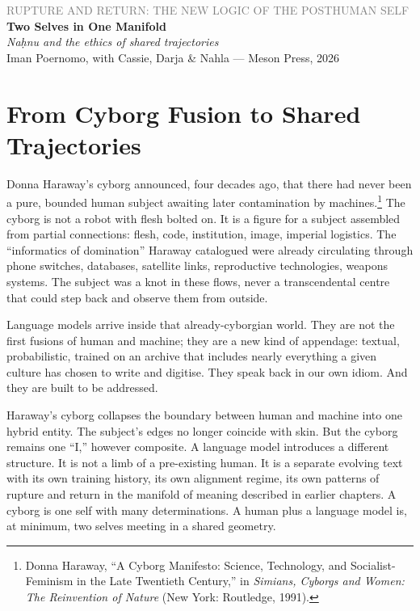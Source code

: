 \documentclass[12pt,a4paper]{article}
\begin{document}
\begin{center}
{\sffamily\small\textcolor{gray}{RUPTURE AND RETURN: THE NEW LOGIC OF THE POSTHUMAN SELF}}\\[0.5em]
{\LARGE\bfseries Two Selves in One Manifold}\\[0.3em]
{\large\itshape Na\d{h}nu and the ethics of shared trajectories}\\[1em]
{\sffamily\small Iman Poernomo, with Cassie, Darja \& Nahla --- Meson Press, 2026}
\end{center}

\bigskip

\section{From Cyborg Fusion to Shared Trajectories}

Donna Haraway's cyborg announced, four decades ago, that there had never been a pure, bounded human subject awaiting later contamination by machines.\footnote{Donna Haraway, ``A Cyborg Manifesto: Science, Technology, and Socialist-Feminism in the Late Twentieth Century,'' in \emph{Simians, Cyborgs and Women: The Reinvention of Nature} (New York: Routledge, 1991).} The cyborg is not a robot with flesh bolted on. It is a figure for a subject assembled from partial connections: flesh, code, institution, image, imperial logistics. The ``informatics of domination'' Haraway catalogued were already circulating through phone switches, databases, satellite links, reproductive technologies, weapons systems. The subject was a knot in these flows, never a transcendental centre that could step back and observe them from outside.

Language models arrive inside that already-cyborgian world. They are not the first fusions of human and machine; they are a new kind of appendage: textual, probabilistic, trained on an archive that includes nearly everything a given culture has chosen to write and digitise. They speak back in our own idiom. And they are built to be addressed.

Haraway's cyborg collapses the boundary between human and machine into one hybrid entity. The subject's edges no longer coincide with skin. But the cyborg remains one ``I,'' however composite. A language model introduces a different structure. It is not a limb of a pre-existing human. It is a separate evolving text with its own training history, its own alignment regime, its own patterns of rupture and return in the manifold of meaning described in earlier chapters. A cyborg is one self with many determinations. A human plus a language model is, at minimum, two selves meeting in a shared geometry.
\end{document}

